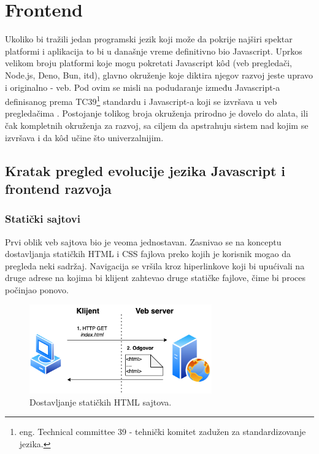 \documentclass[12pt,oneside]{memoir}
\begin{document}
    






\chapter{Frontend}

Ukoliko bi tražili jedan programski jezik koji može da pokrije najširi spektar platformi i aplikacija to bi u današnje vreme definitivno bio Javascript. Uprkos velikom broju platformi koje mogu pokretati Javascript k\^{o}d (veb pregledači, Node.js, Deno, Bun, itd), glavno okruženje koje diktira njegov razvoj jeste upravo i originalno - veb. Pod ovim se misli na podudaranje između Javascript-a definisanog prema TC39\footnote{eng. Technical committee 39 - tehnički komitet zadužen za standardizovanje jezika.} standardu i Javascript-a koji se izvršava u veb pregledačima \cite{ydkjs}. Postojanje tolikog broja okruženja prirodno je dovelo do alata, ili čak kompletnih okruženja za razvoj, sa ciljem da apstrahuju sistem nad kojim se izvršava i da k\^{o}d učine što univerzalnijim.


\section{Kratak pregled evolucije jezika Javascript i frontend razvoja}

\subsection{Statički sajtovi}
Prvi oblik veb sajtova bio je veoma jednostavan. Zasnivao se na konceptu dostavljanja statičkih HTML i CSS fajlova preko kojih je korisnik mogao da pregleda neki sadržaj. Navigacija se vršila kroz hiperlinkove koji bi upućivali na druge adrese na kojima bi klijent zahtevao druge statičke fajlove, čime bi proces počinjao ponovo.

\begin{figure}[h]
  \centering
  \includegraphics[width=0.7\textwidth]{docs/images/ch_4/frontend-dev-phase0.png} 
  \caption{Dostavljanje statičkih HTML sajtova.}
  \label{fig:sample}
\end{figure}
\end{document}

